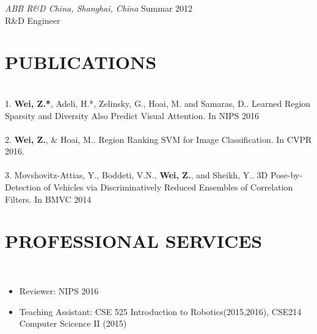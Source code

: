 \documentclass[margin, 11pt]{res} %
\begin{document}
\begin{resume}
{\sl ABB R\&D China, Shanghai, China}  \hfill Summar 2012 \\
R\&D  Engineer\\

\section{PUBLICATIONS} 
~\\
1. \textbf{Wei, Z.*}, Adeli, H.*, Zelinsky, G., Hoai, M. and Samaras, D.. Learned Region Sparsity and Diversity Also Predict Visual Attention. In NIPS 2016\\
~\\
2. \textbf{Wei, Z.}, \& Hoai, M.. Region Ranking SVM for Image Classification. In CVPR 2016. \\
~\\
3. Movshovitz-Attias, Y., Boddeti, V.N., \textbf{Wei, Z.}, and Sheikh, Y.. 3D Pose-by-Detection
of Vehicles via Discriminatively Reduced Ensembles of Correlation Filters.
In BMVC 2014

\section{PROFESSIONAL SERVICES}
~\\
\begin{itemize}
	\item Reviewer: NIPS 2016
	\item Teaching Assistant: CSE 525 Introduction to Robotics(2015,2016), CSE214 Computer Scicence II (2015)			 
\end{itemize}

%
%
%
%
%
% 


\end{resume}
\end{document}
